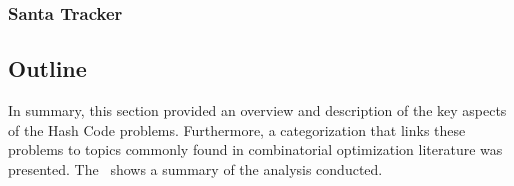\subsubsection*{Santa Tracker}
\label{subsubsec:hashcode-2022-final}

\subsection{Outline}
\label{subsec:hashcode-outline}

In summary, this section provided an overview and description of the key aspects
of the Hash Code problems. Furthermore, a categorization that links these
problems to topics commonly found in combinatorial optimization literature was
presented. The~ shows a summary of the
analysis conducted.

